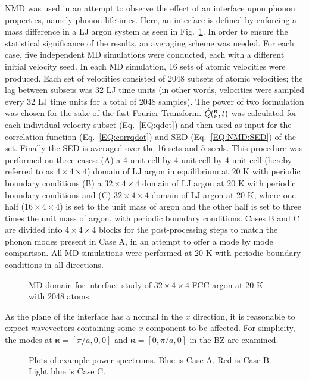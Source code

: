 NMD was used in an attempt to observe the effect of an interface upon phonon properties, namely phonon lifetimes. Here, an interface is defined by enforcing a mass difference in a LJ argon system as seen in Fig.~\ref{fig:interface_domain}. In order to ensure the statistical significance of the results, an averaging scheme was needed. For each case, five independent MD simulations were conducted, each with a different initial velocity seed. In each MD simulation, 16 sets of atomic velocities were produced. Each set of velocities consisted of 2048 subsets of atomic velocities; the lag between subsets was 32 LJ time units (in other words, velocities were sampled every 32 LJ time units for a total of 2048 samples). The power of two formulation was chosen for the sake of the fast Fourier Transform. $\dot{Q}\mspace{-4.0mu}\left(\mspace{-8.0mu} \begin{smallmatrix}&\pmb{\kappa} \\&\nu\end{smallmatrix} \mspace{-2.0mu},t\right)$ was calculated for each individual velocity subset (Eq.~\ref{EQ:qdot}) and then used as input for the correlation function (Eq.~\ref{EQ:corrqdot}) and SED (Eq.~\ref{EQ:NMD:SED}) of the set. Finally the SED is averaged over the 16 sets and 5 seeds. This procedure was performed on three cases: (A) a 4 unit cell by 4 unit cell by 4 unit cell (hereby referred to as $4\times4\times4$) domain of LJ argon in equilibrium at 20 K with periodic boundary conditions (B) a $32\times4\times4$ domain of LJ argon at 20 K with periodic boundary conditions and (C) $32\times4\times4$ domain of LJ argon at 20 K, where one half ($16\times4\times4$) is set to the unit mass of argon and the other half is set to three times the unit mass of argon, with periodic boundary conditions. Cases B and C are divided into $4\times4\times4$ blocks for the post-processing steps to match the phonon modes present in Case A, in an attempt to offer a mode by mode comparison. All MD simulations were performed at 20 K with periodic boundary conditions in all directions.
\begin{figure}%
\begin{center}
\renewcommand{\figure}{Fig.}
\caption{MD domain for interface study of $32\times4\times4$ FCC argon at 20 K with 2048 atoms.}
\label{fig:interface_domain}
\end{center}
\end{figure}
As the plane of the interface has a normal in the $x$ direction, it is reasonable to expect wavevectors containing some $x$ component to be affected. For simplicity, the modes at $\bm{\kappa}=[\pi/a,0,0]$ and $\bm{\kappa}=[0,\pi/a,0]$ in the BZ are examined. 
\renewcommand{\topfraction}{1.0}
\begin{figure*}%
\begin{center}
\renewcommand{\figure}{Fig.}
\caption{Plots of example power spectrums. Blue is Case A. Red is Case B. Light blue is Case C.}
\label{fig:sed}
\end{center}
\end{figure*}

